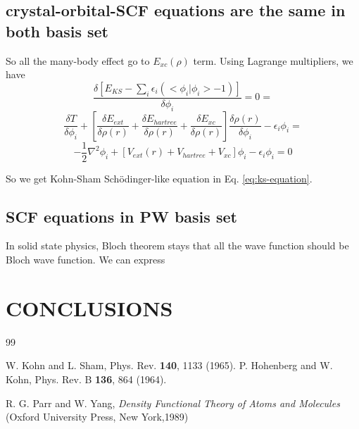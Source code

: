 \documentclass[aps,preprint,12pt]{revtex4-1}
\begin{document}
\subsection{crystal-orbital-SCF equations are the same in both basis set}
So all the many-body effect go to $E_{xc}(\rho)$ term. Using Lagrange multipliers, we have 
\begin{equation}
\dfrac{\delta [E_{KS}-\sum_{i}\epsilon_{i}(<\phi_i|\phi_i> -1)] }
{\delta \phi_i} =  0 =
\end{equation}
\begin{equation}
\dfrac{\delta T}{\delta \phi_i} + 
[\dfrac{\delta E_{ext}}{\delta \rho(r)} + \dfrac{\delta E_{hartree}}{\delta \rho(r)} +  \dfrac{\delta E_{xc}}{\delta \rho(r)} ] 
\dfrac{\delta \rho(r)}{\delta \phi_i}-\epsilon_{i} \phi_i = 
\end{equation}
\begin{equation}
 -\dfrac{1}{2}\nabla^2 \phi_i + 
[V_{ext}(r)+V_{hartree}+V_{xc}] \phi_i -\epsilon_{i} \phi_i = 0
\label{eq:ks-equation}
\end{equation}

So we get Kohn-Sham Sch\"{o}dinger-like equation in Eq. \ref{eq:ks-equation}.


\subsection{SCF equations in PW basis set}
In solid state physics, Bloch theorem stays that all
the wave function should be Bloch wave function. We can
express 





\section{CONCLUSIONS}

\begin{acknowledgments}

\end{acknowledgments}


\begin{thebibliography} {99}


 W. Kohn and L. Sham, Phys. Rev. {\bf 140}, 1133 (1965).
 P. Hohenberg and W. Kohn, Phys. Rev. B {\bf 136}, 864 (1964).

 R. G. Parr and W. Yang, \emph{Density Functional Theory of Atoms and Molecules }(Oxford University Press, New York,1989)

\end{thebibliography}
\end{document}
